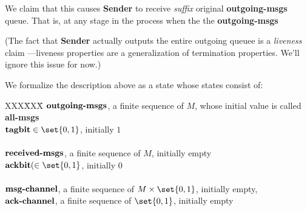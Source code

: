 We claim that this causes \textbf{Sender} to receive \emph{suffix}
original \textbf{outgoing-msgs} queue.  That is, at any stage in the
process when the the \textbf{outgoing-msgs}

(The fact that \textbf{Sender} actually outputs the entire outgoing
queuee is a \emph{liveness} claim ---liveness properties are a
generalization of termination properties.  We'll ignore this issue for
now.)

We formalize the description above as a state whose states consist of:
\begin{tabbing}
XXX\=XXX\= \kill \> $\text{\textbf{outgoing-msgs}}$, a finite sequence of $M$,
whose initial value is called \textbf{all-msgs}\\ \> $\text{\textbf{tagbit}} \in
\set{0, 1}$, initially $1$ \\ \\ \> $\text{\textbf{received-msgs}}$, a finite
sequence of $M$, initially empty\\ \> $\text{\textbf{ackbit}}( \in \set{0, 1}$,
initially $0$ \\ \\ \> $\text{\textbf{msg-channel}}$, a finite sequence of $M
\times \set{0, 1}$, initially empty, \\ \> $\text{\textbf{ack-channel}}$, a
finite sequence of $\set{0, 1}$, initially empty
\end{tabbing}

